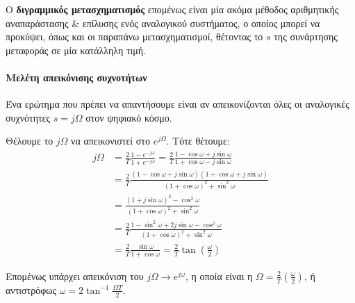 \documentclass[11pt,a4paper,notitlepage,fleqn]{article}
\begin{document}
Ο \textbf{διγραμμικός μετασχηματισμός} επομένως είναι μία ακόμα μέθοδος αριθμητικής αναπαράστασης \&
επίλυσης ενός αναλογικού συστήματος, ο οποίος μπορεί να προκύψει, όπως και οι παραπάνω μετασχηματισμοί,
θέτοντας το \( s \) της συνάρτησης μεταφοράς σε μία κατάλληλη τιμή.

\paragraph{Μελέτη απεικόνισης συχνοτήτων}
Ένα ερώτημα που πρέπει να απαντήσουμε είναι αν απεικονίζονται όλες οι αναλογικές συχνότητες \( s=jΩ \)
στον ψηφιακό κόσμο.

Θέλουμε το \( j\Omega \) να απεικονιστεί στο \( e^{j\Omega} \). Τότε θέτουμε:
\begin{align*}
	jΩ &= \frac{2}{T} \frac{1-e^{-j\omega }}{1+e^{-j\omega }} = \frac{2}{T} \frac{1-\cos \omega +j\sin \omega}{1+\cos \omega - j \sin \omega}
	\\ &= \frac{2}{T} \frac{
	(1-\cos \omega + j\sin \omega)(1+\cos \omega + j \sin \omega)
    }{(1+\cos \omega)^2 + \sin^2 \omega}
    \\ &= \frac{(1+j\sin \omega)^2 - \cos^2\omega}{(1+\cos\omega)^2 + \sin^2\omega}
    \\ &= \frac{2}{T} \frac{1-\sin^2\omega + 2j\sin\omega - \cos^2\omega}{(1+\cos\omega)^2 + \sin^2\omega}
    \\ &= \frac{2}{T} \frac{\sin\omega}{1+\cos \omega} = \frac{2}{T} \tan\left(\frac{\omega}{2}\right)
\end{align*}

Επομένως υπάρχει απεικόνιση του \( j\Omega \to e^{j\omega} \), η οποία είναι η \( \Omega = \frac{2}{T}\left(\frac{\omega}{2}\right) \), ή αντιστρόφως \( \omega = 2\tan^{-1}\frac{\Omega T}{2} \).

\end{document}
